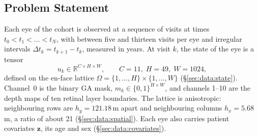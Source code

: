 \subsection{Problem Statement}
\label{sec:background:problem}

Each eye of the cohort is observed at a sequence of visits at times
\mbox{$t_0 < t_1 < \dots < t_N$}, with between five and thirteen visits per eye
and irregular intervals $\Delta t_k = t_{k+1} - t_k$, measured in years.
At visit $k$, the state of the eye is a tensor
\begin{equation*}
  u_k \in \mathbb{R}^{C \times H \times W}, \qquad C = 11,\; H = 49,\; W = 1024,
\end{equation*}
defined on the en-face lattice $\Omega = \{1, \dots, H\} \times \{1, \dots, W\}$
(\S\ref{sec:data:state}). Channel~0 is the binary GA mask,
$m_k \in \{0, 1\}^{H \times W}$, and channels 1--10 are the depth maps of
ten retinal layer boundaries. The lattice is anisotropic: neighbouring rows
are $h_y = 121.18$\,\textmu{}m apart and neighbouring columns $h_x = 5.68$\,\textmu{}m,
a ratio of about 21 (\S\ref{sec:data:spatial}). Each eye also carries
patient covariates $\mathbf{z}$, its age and sex (\S\ref{sec:data:covariates}).

